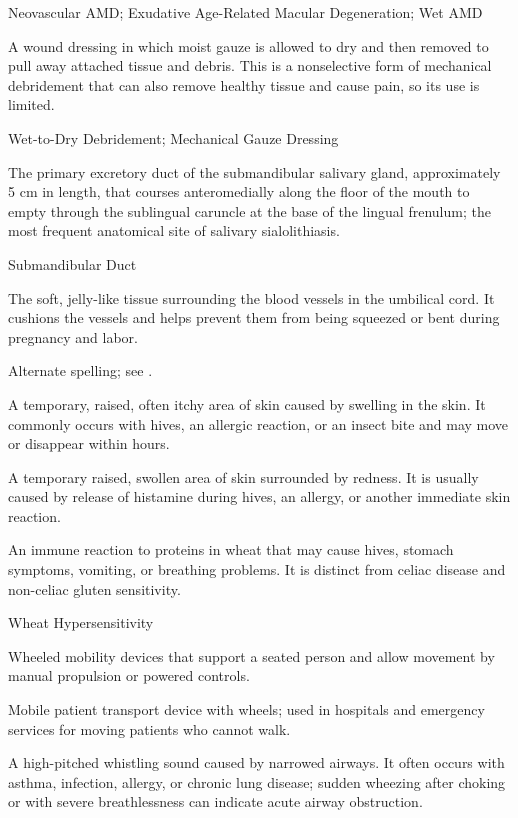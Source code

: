 \synonyms
Neovascular AMD; Exudative Age-Related Macular Degeneration; Wet AMD

 A wound dressing in which moist gauze is allowed to dry and then removed to pull away attached tissue and debris. This is a nonselective form of mechanical debridement that can also remove healthy tissue and cause pain, so its use is limited.

\synonyms
Wet-to-Dry Debridement; Mechanical Gauze Dressing

 The primary excretory duct of the submandibular salivary gland, approximately 5 cm in length, that courses anteromedially along the floor of the mouth to empty through the sublingual caruncle at the base of the lingual frenulum; the most frequent anatomical site of salivary sialolithiasis.

\synonyms
Submandibular Duct

 The soft, jelly-like tissue surrounding the blood vessels in the umbilical cord. It cushions the vessels and helps prevent them from being squeezed or bent during pregnancy and labor.

 Alternate spelling; see .

 A temporary, raised, often itchy area of skin caused by swelling in the skin. It commonly occurs with hives, an allergic reaction, or an insect bite and may move or disappear within hours.

 A temporary raised, swollen area of skin surrounded by redness. It is usually caused by release of histamine during hives, an allergy, or another immediate skin reaction.

 An immune reaction to proteins in wheat that may cause hives, stomach symptoms, vomiting, or breathing problems. It is distinct from celiac disease and non-celiac gluten sensitivity.

\synonyms
Wheat Hypersensitivity

 Wheeled mobility devices that support a seated person and allow movement by manual propulsion or powered controls.

 Mobile patient transport device with wheels; used in hospitals and emergency services for moving patients who cannot walk.

 A high-pitched whistling sound caused by narrowed airways. It often occurs with asthma, infection, allergy, or chronic lung disease; sudden wheezing after choking or with severe breathlessness can indicate acute airway obstruction.

